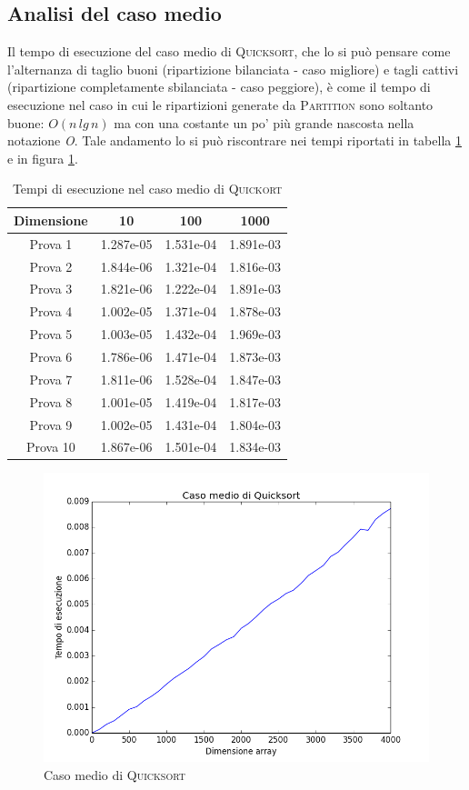 \documentclass[11pt]{article}
\begin{document}
\subsection{Analisi del caso medio}
Il tempo di esecuzione del caso medio di \textsc{Quicksort}, che lo si può pensare come l'alternanza di taglio buoni (ripartizione bilanciata - caso migliore) e tagli cattivi (ripartizione completamente sbilanciata - caso peggiore), è come il tempo di esecuzione nel caso in cui le ripartizioni generate da \textsc{Partition} sono soltanto buone: $O(n\,lg\,n)$ ma con una costante un po' più grande nascosta nella notazione \textit{O}. Tale andamento lo si può riscontrare nei tempi riportati in tabella \ref{t_medio_quick} e in figura \ref{medio_quick}.
\begin{table}[h]
\centering
\begin{tabular}{|c|c|c|c|}\hline
Dimensione &10 &100 &1000\\ \hline
Prova 1	&1.287e-05	&1.531e-04 &1.891e-03 \\ \hline
Prova 2	&1.844e-06	&1.321e-04	&1.816e-03 \\ \hline
Prova 3	&1.821e-06	&1.222e-04	&1.891e-03 \\ \hline
Prova 4	&1.002e-05	&1.371e-04	&1.878e-03	 \\ \hline
Prova 5	&1.003e-05	&1.432e-04 &1.969e-03 \\ \hline
Prova 6	&1.786e-06	&1.471e-04&1.873e-03  \\ \hline
Prova 7	&1.811e-06	&1.528e-04	&1.847e-03  \\ \hline
Prova 8	&1.001e-05	&1.419e-04	&1.817e-03 \\ \hline
Prova 9	&1.002e-05	&1.431e-04	&1.804e-03	 \\ \hline
Prova 10&1.867e-06	&1.501e-04 &1.834e-03\\ \hline
\end{tabular}
\caption{Tempi di esecuzione nel caso medio di \textsc{Quickort}}
\label{t_medio_quick}
\end{table}
\begin{figure}[h]
\centering
\includegraphics[scale=0.33,angle=0]{medio_quicksort.png}
\caption{Caso medio di \textsc{Quicksort}}
\label{medio_quick}
\end{figure}
\end{document}
